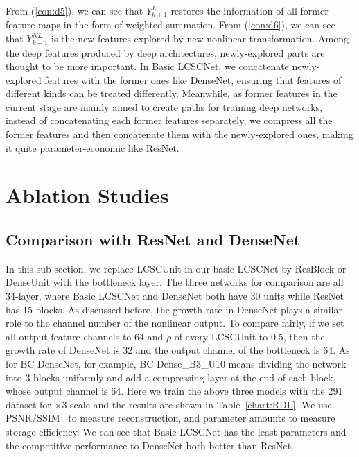 \documentclass[journal]{IEEEtran}
\begin{document}
From (\ref{con:d5}), we can see that $Y_{k+1}^{L}$ restores the information of all former feature maps in the form of weighted summation. From (\ref{con:d6}), we can see that $Y_{k+1}^{NL}$ is the new features explored by new nonlinear transformation. Among the deep features produced by deep architectures, newly-explored parts are thought to be more important. In Basic LCSCNet, we concatenate newly-explored features with the former ones like DenseNet, ensuring that features of different kinds can be treated differently. Meanwhile, as former features in the current stage are mainly aimed to create paths for training deep networks, instead of concatenating each former features separately, we compress all the former features and then concatenate them with the newly-explored ones, making it quite parameter-economic like ResNet.  





\section{Ablation Studies}\label{s:s_5}

\subsection{Comparison with ResNet and DenseNet}\label{s:s_5::A}

In this sub-section, we replace LCSCUnit in our basic LCSCNet by ResBlock or DenseUnit with the bottleneck layer. The three networks for comparison are all 34-layer, where Basic LCSCNet and DenseNet both have 30 units while ResNet has 15 blocks. As discussed before, the growth rate in DenseNet plays a similar role to the channel number of the nonlinear output. To compare fairly, if we set all output feature channels to 64 and $\rho$ of every LCSCUnit to 0.5, then the growth rate of DenseNet is 32 and the output channel of the bottleneck is 64. As for BC-DenseNet, for example, BC-Dense\_B3\_U10 means dividing the network into 3 blocks uniformly and add a compressing layer at the end of each block, whose output channel is 64. Here we train the above three models with the 291 dataset for $\times 3$ scale and the results are shown in Table~\ref{chart:RDL}. We use PSNR/SSIM~\cite{wang2004image} to measure reconstruction, and parameter amounts to measure storage efficiency. We can see that Basic LCSCNet has the least parameters and the competitive performance to DenseNet both better than ResNet. 
\end{document}
